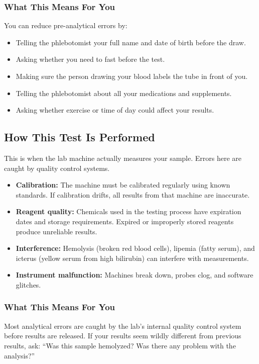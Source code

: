 \subsubsection{What This Means For You}

You can reduce pre-analytical errors by:
\begin{itemize}
    \item Telling the phlebotomist your full name and date of birth before the draw.
    \item Asking whether you need to fast before the test.
    \item Making sure the person drawing your blood labels the tube in front of you.
    \item Telling the phlebotomist about all your medications and supplements.
    \item Asking whether exercise or time of day could affect your results.
\end{itemize}

\subsection{How This Test Is Performed}

This is when the lab machine actually measures your sample. Errors here are caught by quality control systems.

\begin{itemize}
    \item \textbf{Calibration:} The machine must be calibrated regularly using known standards. If calibration drifts, all results from that machine are inaccurate.
    \item \textbf{Reagent quality:} Chemicals used in the testing process have expiration dates and storage requirements. Expired or improperly stored reagents produce unreliable results.
    \item \textbf{Interference:} Hemolysis (broken red blood cells), lipemia (fatty serum), and icterus (yellow serum from high bilirubin) can interfere with measurements.
    \item \textbf{Instrument malfunction:} Machines break down, probes clog, and software glitches.
\end{itemize}

\subsubsection{What This Means For You}

Most analytical errors are caught by the lab's internal quality control system before results are released. If your results seem wildly different from previous results, ask: ``Was this sample hemolyzed? Was there any problem with the analysis?''

